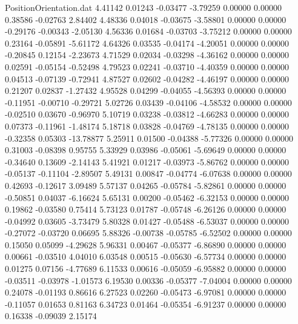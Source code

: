 \begin{filecontents}{PositionOrientation.dat}
   4.41142    0.01243   -0.03477    -3.79259    0.00000    0.00000    0.38586   -0.02763    2.84402
   4.48336    0.04018   -0.03675    -3.58801    0.00000    0.00000   -0.29176   -0.00343   -2.05130
   4.56336    0.01684   -0.03703    -3.75212    0.00000    0.00000    0.23164   -0.05891   -5.61172
   4.64326    0.03535   -0.04174    -4.20051    0.00000    0.00000   -0.20845    0.12154   -2.23673
   4.71529    0.02034   -0.03298    -4.36162    0.00000    0.00000    0.02591   -0.05154   -0.52498
   4.79523    0.02241   -0.03710    -4.40359    0.00000    0.00000    0.04513   -0.07139   -0.72941
   4.87527    0.02602   -0.04282    -4.46197    0.00000    0.00000    0.21207    0.02837   -1.27432
   4.95528    0.04299   -0.04055    -4.56393    0.00000    0.00000   -0.11951   -0.00710   -0.29721
   5.02726    0.03439   -0.04106    -4.58532    0.00000    0.00000   -0.02510    0.03670   -0.96970
   5.10719    0.03238   -0.03812    -4.66283    0.00000    0.00000    0.07373   -0.11961   -1.48174
   5.18718    0.03828   -0.04769    -4.78135    0.00000    0.00000   -0.32358    0.05303  -13.78877
   5.25911    0.01500   -0.04388    -5.77326    0.00000    0.00000    0.31003   -0.08398    0.95755
   5.33929    0.03986   -0.05061    -5.69649    0.00000    0.00000   -0.34640    0.13609   -2.14143
   5.41921    0.01217   -0.03973    -5.86762    0.00000    0.00000   -0.05137   -0.11104   -2.89507
   5.49131    0.00847   -0.04774    -6.07638    0.00000    0.00000    0.42693   -0.12617    3.09489
   5.57137    0.04265   -0.05784    -5.82861    0.00000    0.00000   -0.50851    0.04037   -6.16624
   5.65131    0.00200   -0.05462    -6.32153    0.00000    0.00000    0.19862   -0.03580    0.75414
   5.73123    0.01787   -0.05748    -6.26126    0.00000    0.00000   -0.04992    0.03605   -3.73479
   5.80328    0.01427   -0.05488    -6.53037    0.00000    0.00000   -0.27072   -0.03720    0.06695
   5.88326   -0.00738   -0.05785    -6.52502    0.00000    0.00000    0.15050    0.05099   -4.29628
   5.96331    0.00467   -0.05377    -6.86890    0.00000    0.00000    0.00661   -0.03510    4.04010
   6.03548    0.00515   -0.05630    -6.57734    0.00000    0.00000    0.01275    0.07156   -4.77689
   6.11533    0.00616   -0.05059    -6.95882    0.00000    0.00000   -0.03511   -0.03978   -1.01573
   6.19530    0.00336   -0.05377    -7.04004    0.00000    0.00000    0.24078   -0.01193    0.86616
   6.27523    0.02260   -0.05473    -6.97081    0.00000    0.00000   -0.11057    0.01653    0.81163
   6.34723    0.01464   -0.05354    -6.91237    0.00000    0.00000    0.16338   -0.09039    2.15174

\end{filecontents}
